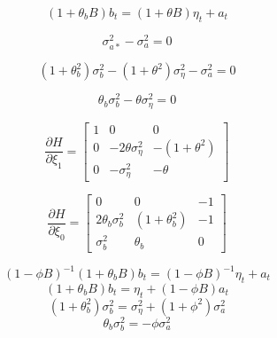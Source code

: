 $$ (1 + \theta_bB)b_t = (1 + \theta B) \eta_t + a_t $$

$$\sigma_{a*}^2 - \sigma_a^2 = 0$$

$$ (1 + \theta_b^2)\sigma_b^2 - (1 + \theta^2)\sigma_\eta^2 - \sigma_a^2 = 0$$

$$ \theta_b\sigma_b^2 - \theta\sigma_\eta^2 = 0 $$

$$ \frac{\partial H}{\partial \xi_1} = \left[\begin{array}{ccc}
    1 & 0 & 0 \\
    0 & -2\theta\sigma_\eta^2 & -(1 + \theta^2) \\
    0 & -\sigma_\eta^2 & -\theta
\end{array}\right] $$

$$ \frac{\partial H}{\partial \xi_0} = \left[\begin{array}{ccc}
    0 & 0 & -1 \\
    2\theta_b\sigma_b^2 & (1 + \theta_b^2) & -1 \\
    \sigma_b^2 & \theta_b & 0
\end{array}\right] $$









\begin{equation}
    \label{eq:w-y-a_notheta}
    (1 - \phi B)^{-1}(1 + \theta_bB)b_t = (1-\phi B)^{-1}\eta_t + a_t 
\end{equation}
\begin{equation}
    \label{eq:w-y-a_notheta2}
    (1 + \theta_bB)b_t = \eta_t + (1 - \phi B)a_t 
\end{equation}
\begin{equation}
    \label{eq:H_notheta1}
    (1 + \theta_b^2)\sigma_b^2 = \sigma_\eta^2 + (1 + \phi^2)\sigma_a^2 
\end{equation}
\begin{equation}
    \label{eq:H_notheta1}
    \theta_b\sigma_b^2 = -\phi\sigma_a^2 
\end{equation}


